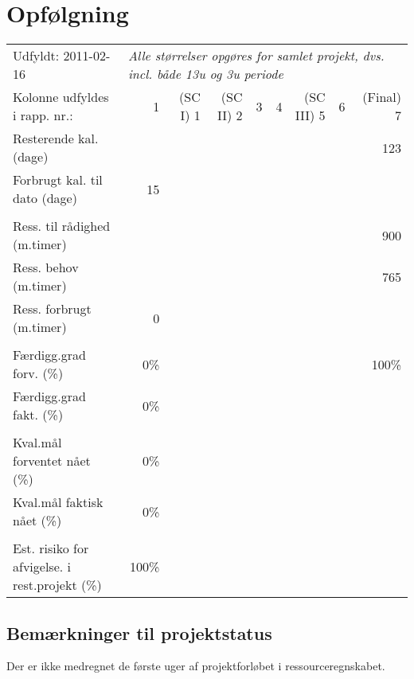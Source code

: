 \section{Opfølgning}
\begin{footnotesize}
\begin{tabular}{p{4cm} | r r r r r r r r}
	Udfyldt: 2011-02-16 & \multicolumn{8}{l}{\textit{Alle størrelser opgøres for samlet projekt, dvs. incl. både 13u og 3u periode}} \\
	Kolonne udfyldes i rapp. nr.: & 1 & (SC I) 1 & (SC II) 2 & 3 & 4 & (SC III) 5 & 6 & (Final) 7 \\
	\hline
	Resterende kal. (dage) & & & & & & & & 123 \\ %
	Forbrugt kal. til dato (dage) & 15 & & & & & & & \\
	\\
	Ress. til rådighed (m.timer) & & & & & & & & 900 \\
	Ress. behov (m.timer) & & & & & & & & 765\\
	Ress. forbrugt (m.timer) & 0 & & & & & & & \\
	\\
	Færdigg.grad forv. (\%) & 0\% & & & & & & & 100\% \\
	Færdigg.grad fakt. (\%) & 0\% & & & & & & & \\
	\\
	Kval.mål forventet nået (\%) & 0\% & & & & & & & \\
	Kval.mål faktisk nået (\%) & 0\% & & & & & & & \\
	\\
	Est. risiko for afvigelse. i rest.projekt (\%) & 100\% & & & & & & & 
\end{tabular}
\end{footnotesize}

\subsection{Bemærkninger til projektstatus}
Der er ikke medregnet de første uger af projektforløbet i ressourceregnskabet.